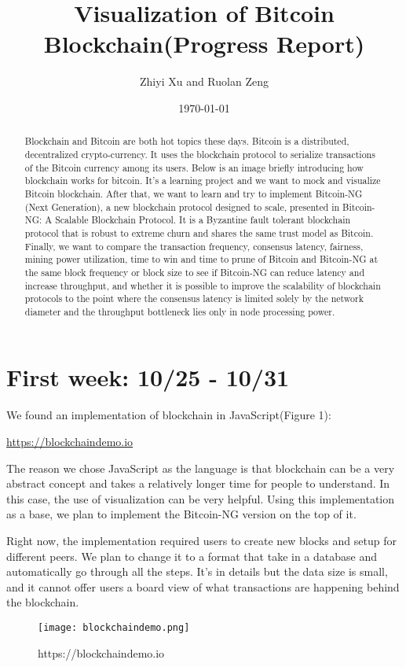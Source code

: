 \documentclass[a4paper]{article}
\title{Visualization of Bitcoin Blockchain(Progress Report)}
\author{Zhiyi Xu and Ruolan Zeng}
\date{\today}
\begin{document}
\maketitle

\begin{abstract}
Blockchain and Bitcoin are both hot topics these days. Bitcoin is a distributed, decentralized crypto-currency. It uses the blockchain protocol to serialize transactions of the Bitcoin currency among its users. Below is an image briefly introducing how blockchain works for bitcoin. It’s a learning project and we want to mock and visualize Bitcoin blockchain. After that, we want to learn and try to implement Bitcoin-NG (Next Generation), a new blockchain protocol designed to scale, presented in Bitcoin-NG: A Scalable Blockchain Protocol. It is a Byzantine fault tolerant blockchain protocol that is robust to extreme churn and shares the same trust model as Bitcoin. Finally, we want to compare the transaction frequency, consensus latency, fairness, mining power utilization, time to win and time to prune of Bitcoin and Bitcoin-NG at the same block frequency or block size to see if Bitcoin-NG can reduce latency and increase throughput, and whether it is possible to improve the scalability of blockchain protocols to the point where the consensus latency is limited solely by the network diameter and the throughput bottleneck lies only in node processing power.

\end{abstract}

\section{First week: 10/25 - 10/31}
We found an implementation of blockchain in JavaScript(Figure 1):

\href{https://blockchaindemo.io}{https://blockchaindemo.io}

The reason we chose JavaScript as the language is that blockchain can be a very abstract concept and takes a relatively longer time for people to understand. In this case, the use of visualization can be very helpful. Using this implementation as a base, we plan to implement the Bitcoin-NG version on the top of it.

Right now, the implementation required users to create new blocks and setup for different peers. We plan to change it to a format that take in a database and automatically go through all the steps. It's in details but the data size is small, and it cannot offer users a board view of what transactions are happening behind the blockchain.
\begin{figure}
\centering
\texttt{[image: blockchaindemo.png]}
\caption{\label{fig:data}https://blockchaindemo.io}
\end{figure}
\end{document}
